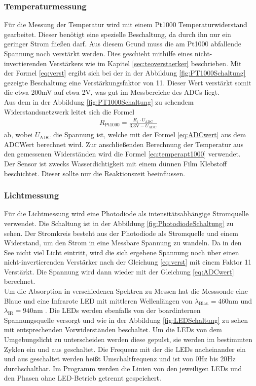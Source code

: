 \documentclass[12pt,a4paper,titlepage,headinclude,bibtotoc]{scrartcl}
\numberwithin{equation}{subsection}
\begin{document}
\subsubsection{Temperaturmessung}
Für die Messung der Temperatur wird mit einem Pt1000 Temperaturwiderstand gearbeitet.
Dieser benötigt eine spezielle Beschaltung, da durch ihn nur ein geringer Strom fließen darf.
Aus diesem Grund muss die am Pt1000 abfallende Spannung noch verstärkt werden.
Dies geschieht mithilfe eines nicht-invertierenden Verstärkers wie im Kapitel \ref{sec:teoverstaerker} beschrieben.
Mit der Formel \eqref{eq:verst} ergibt sich bei der in der Abbildung \ref{fig:PT1000Schaltung} gezeigte Beschaltung eine Verstärkungsfaktor von 11.
Dieser Wert verstärkt somit die etwa 200\si{\milli\volt} auf etwa 2\si{\volt}, was gut im Messbereiche des ADCs liegt.\\
Aus dem in der Abbildung \ref{fig:PT1000Schaltung} zu sehendem Widerstandsnetzwerk leitet sich die Formel
\begin{align}
	R_\text{Pt1000}=\frac{R_1\cdot U_\text{ADC}}{3.3\si{\volt}-U_\text{ADC}}
\end{align}
ab, wobei $U_\text{ADC}$ die Spannung ist, welche mit der Formel \eqref{eq:ADCwert} aus dem ADCWert berechnet wird.
Zur anschließenden Berechnung der Temperatur aus den gemessenen Widerständen wird die Formel \eqref{eq:temperapt1000} verwendet.\\
Der Sensor ist zwecks Wasserdichtigkeit mit einem dünnen Film Klebstoff beschichtet.
Dieser sollte nur die Reaktionszeit beeinflussen.

\subsubsection{Lichtmessung}
Für die Lichtmessung wird eine Photodiode als intensitätsabhängige Stromquelle verwendet.
Die Schaltung ist in der Abbildung \ref{fig:PhotodiodeSchaltung} zu sehen.
Der Stromkreis besteht aus der Photodiode als Stromquelle und einem Widerstand, um den Strom in eine Messbare Spannung zu wandeln.
Da in den See nicht viel Licht eintritt, wird die sich ergebene Spannung noch über einen nicht-invertierenden Verstärker nach der Gleichung \ref{eq:verst} mit einem Faktor 11 Verstärkt.
Die Spannung wird dann wieder mit der Gleichung \eqref{eq:ADCwert} berechnet.\\
Um die Absorption in verschiedenen Spektren zu Messen hat die Messsonde eine Blaue und eine Infrarote LED
mit mittleren Wellenlängen von $\lambda_\text{Blau}=460\si{\nano\meter}$ \cite[2]{BLAUDatenblatt} und $\lambda_\text{IR}=940\si{\nano\meter}$ \cite[4]{IRDatenblatt}.
Die LEDs werden ebenfalls von der boardinternen Spannungsquelle versorgt und wie in der Abbildung \ref{fig:LEDSchaltung} zu sehen mit entsprechenden Vorwiderständen beschaltet.
Um die LEDs von dem Umgebungslicht zu unterscheiden werden diese gepulst, sie werden im bestimmten Zyklen ein und aus geschaltet.
Die Frequenz mit der die LEDs nacheinander ein und aus geschaltet werden heißt Umschaltfrequenz und ist von 0\si{\hertz} bis 20\si{\hertz} durchschaltbar.
Im Programm werden die Linien von den jeweiligen LEDs und den Phasen ohne LED-Betrieb getrennt gespeichert.
\end{document}
